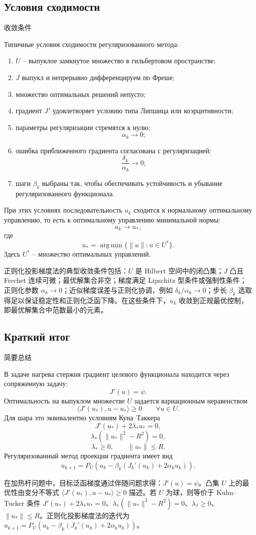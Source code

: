 \documentclass[12pt,a4paper]{article}
\newcommand{\zh}[1]{\par\noindent #1\par}
\begin{document}
\subsection*{Условия сходимости}
\zh{收敛条件}
Типичные условия сходимости регуляризованного метода:
\begin{enumerate}[leftmargin=2em]
\item \(U\) -- выпуклое замкнутое множество в гильбертовом пространстве;
\item \(J\) выпукл и непрерывно дифференцируем по Фреше;
\item множество оптимальных решений непусто;
\item градиент \(J'\) удовлетворяет условию типа Липшица или коэрцитивности;
\item параметры регуляризации стремятся к нулю:
\[
\alpha_k\to0;
\]
\item ошибка приближенного градиента согласована с регуляризацией:
\[
\frac{\delta_k}{\alpha_k}\to0;
\]
\item шаги \(\beta_k\) выбраны так, чтобы обеспечивать устойчивость и убывание регуляризованного функционала.
\end{enumerate}
При этих условиях последовательность \(u_k\) сходится к нормальному оптимальному управлению, то есть к оптимальному управлению минимальной нормы:
\[
u_k\to u_*,
\]
где
\[
u_*=
\operatorname*{arg\,min}\{\|u\|:u\in U^*\}.
\]
Здесь \(U^*\) -- множество оптимальных управлений.
\zh{正则化投影梯度法的典型收敛条件包括：\(U\) 是 Hilbert 空间中的闭凸集；\(J\) 凸且 Frechet 连续可微；最优解集合非空；梯度满足 Lipschitz 型条件或强制性条件；正则化参数 \(\alpha_k\to0\)；近似梯度误差与正则化协调，例如 \(\delta_k/\alpha_k\to0\)；步长 \(\beta_k\) 选取得足以保证稳定性和正则化泛函下降。在这些条件下，\(u_k\) 收敛到正规最优控制，即最优解集合中范数最小的元素。}

\subsection*{Краткий итог}
\zh{简要总结}
В задаче нагрева стержня градиент целевого функционала находится через сопряженную задачу:
\[
J'(u)=\psi.
\]
Оптимальность на выпуклом множестве \(U\) задается вариационным неравенством
\[
\langle J'(u_*),u-u_*\rangle\ge0
\qquad \forall u\in U.
\]
Для шара это эквивалентно условиям Куна--Таккера
\[
J'(u_*)+2\lambda_*u_*=0,
\]
\[
\lambda_*(\|u_*\|^2-R^2)=0,
\]
\[
\lambda_*\ge0,
\qquad
\|u_*\|\le R.
\]
Регуляризованный метод проекции градиента имеет вид
\[
u_{k+1}=P_U\left(u_k-\beta_k(J_k'(u_k)+2\alpha_k u_k)\right).
\]
\zh{在加热杆问题中，目标泛函梯度通过伴随问题求得：\(J'(u)=\psi\)。凸集 \(U\) 上的最优性由变分不等式 \(\langle J'(u_*),u-u_*\rangle\ge0\) 描述。若 \(U\) 为球，则等价于 Kuhn--Tucker 条件 \(J'(u_*)+2\lambda_*u_*=0\)、\(\lambda_*(\|u_*\|^2-R^2)=0\)、\(\lambda_*\ge0\)、\(\|u_*\|\le R\)。正则化投影梯度法的迭代为 \(u_{k+1}=P_U(u_k-\beta_k(J_k'(u_k)+2\alpha_k u_k))\)。}
\end{document}

